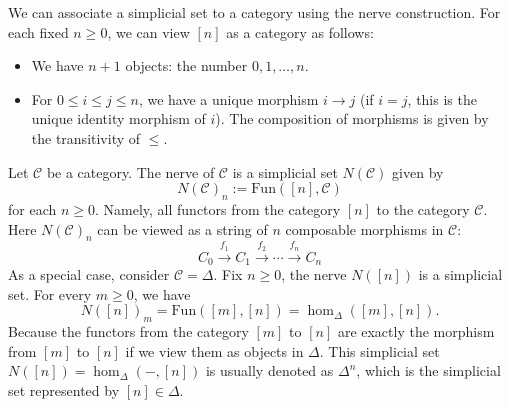 We can associate a simplicial set to a category using the nerve construction. For each fixed \(n\geq 0\), we can view \([n]\) as a category as follows:
\begin{itemize}
    \item We have \(n+1\) objects: the number \(0,1,\ldots,n\).
    \item For \(0\leq i\leq j\leq n\), we have a unique morphism \(i\rightarrow j\) (if \(i=j\), this is the unique identity morphism of \(i\)). The composition of morphisms is given by the transitivity of \(\leq\).  
\end{itemize}

\begin{example}
    Let \(\mathcal{C}\) be a category. The nerve of \(\mathcal{C}\) is a simplicial set \(N(\mathcal{C})\) given by 
    \[N(\mathcal{C})_n:=\text{Fun}([n],\mathcal{C})\]
    for each \(n\geq 0\). Namely, all functors from the category \([n]\) to the category \(\mathcal{C}\). Here \(N(\mathcal{C})_n\) can be viewed as a string of \(n\) composable morphisms in \(\mathcal{C}\):
    \[C_0\xrightarrow{f_1}C_1\xrightarrow{f_2}\cdots\xrightarrow{f_{n}}C_n\]
    As a special case, consider \(\mathcal{C}=\Delta\). Fix \(n\geq 0\), the nerve \(N([n])\) is a simplicial set. For every \(m\geq 0\), we have 
    \[N([n])_m=\text{Fun}([m],[n])=\hom_\Delta([m],[n]).\]
    Because the functors from the category \([m]\) to \([n]\) are exactly the morphism from \([m]\) to \([n]\) if we view them as objects in \(\Delta\). This simplicial set \(N([n])=\hom_\Delta(-,[n])\) is usually denoted as \(\Delta^n\), which is the simplicial set represented by \([n]\in \Delta\).
\end{example}
